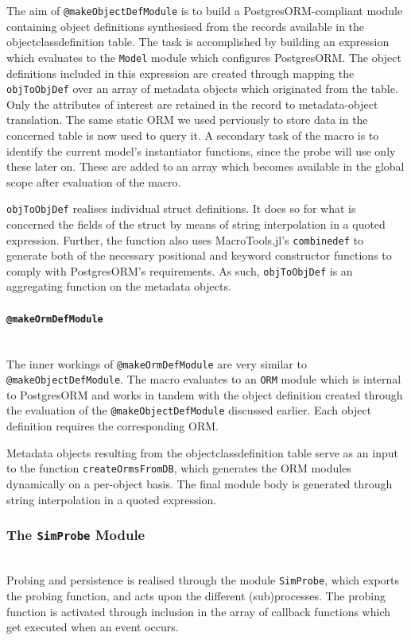 \documentclass{juliacon}
\begin{document}
The aim of \texttt{@makeObjectDefModule} is to build a PostgresORM-compliant module containing object definitions synthesised from the records available in the objectclassdefinition table. The task is accomplished by building an expression which evaluates to the \texttt{Model} module which configures PostgresORM. The object definitions included in this expression are created through mapping the \texttt{objToObjDef} over an array of metadata objects which originated from the table. Only the attributes of interest are retained in the record to metadata-object translation. The same static ORM we used perviously to store data in the concerned table is now used to query it. A secondary task of the macro is to identify the current model's instantiator functions, since the probe will use only these later on. These are added to an array which becomes available in the global scope after evaluation of the macro. \vskip 6pt

\texttt{objToObjDef} realises individual struct definitions. It does so for what is concerned the fields of the struct by means of string interpolation in a quoted expression. Further, the function also uses MacroTools.jl's \texttt{combinedef} to generate both of the necessary positional and keyword constructor functions to comply with PostgresORM's requirements. As such, \texttt{objToObjDef} is an aggregating function on the metadata objects.\vskip 6pt

\paragraph{\textnormal{\texttt{@makeOrmDefModule}}}\hfill\\

The inner workings of \texttt{@makeOrmDefModule} are very similar to \texttt{@makeObjectDefModule}. The macro evaluates to an \texttt{ORM} module which is internal to PostgresORM and works in tandem with the object definition created through the evaluation of the \texttt{@makeObjectDefModule} discussed earlier. Each object definition requires the corresponding ORM.\vskip 6pt

Metadata objects resulting from the objectclassdefinition table serve as an input to the function \texttt{createOrmsFromDB}, which generates the ORM modules dynamically on a per-object basis. The final module body is generated through string interpolation in a quoted expression.\vskip 6pt

\subsubsection{The \textnormal{\texttt{SimProbe}} Module}\hfill\\
Probing and persistence is realised through the module \texttt{SimProbe}, which exports the probing function, and acts upon the different (sub)processes. The probing function is activated through inclusion in the array of callback functions which get executed when an event occurs. \vskip 6pt
\end{document}
